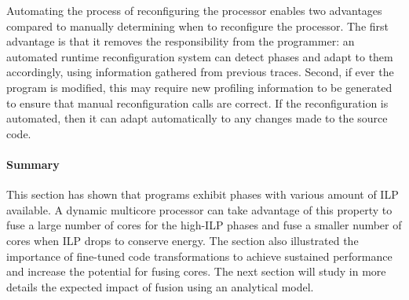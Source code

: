 Automating the process of reconfiguring the processor enables two advantages compared to manually determining when to reconfigure the processor.
The first advantage is that it removes the responsibility from the programmer: an automated runtime reconfiguration system can detect phases and adapt to them accordingly, using information gathered from previous traces.
Second, if ever the program is modified, this may require new profiling information to be generated to ensure that manual reconfiguration calls are correct.
If the reconfiguration is automated, then it can adapt automatically to any changes made to the source code.

\paragraph{Summary}
This section has shown that programs exhibit phases with various amount of ILP available.
A dynamic multicore processor can take advantage of this property to fuse a large number of cores for the high-ILP phases and fuse a smaller number of cores when ILP drops to conserve energy.
The section also illustrated the importance of fine-tuned code transformations to achieve sustained performance and increase the potential for fusing cores.
The next section will study in more details the expected impact of fusion using an analytical model.

